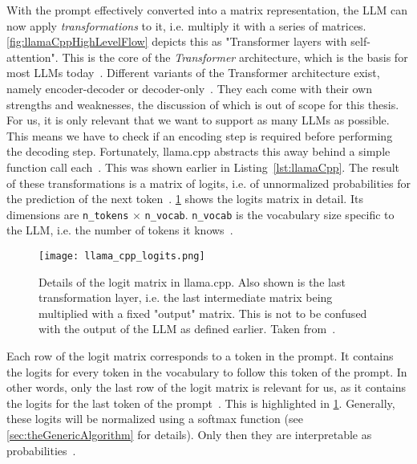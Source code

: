 With the prompt effectively converted into a matrix representation, the \gls{LLM} can now apply \textit{transformations} to it, i.e. multiply it with a series of matrices. \cref{fig:llamaCppHighLevelFlow} depicts this as "Transformer layers with self-attention". This is the core of the \textit{Transformer} architecture, which is the basis for most \glspl{LLM} today~\cite{vaswaniAttentionAllYou2023}. Different variants of the Transformer architecture exist, namely encoder-decoder or decoder-only~\cite{mallisUnderstandingHowLLM2023}. They each come with their own strengths and weaknesses, the discussion of which is out of scope for this thesis. For us, it is only relevant that we want to support as many \glspl{LLM} as possible. This means we have to check if an encoding step is required before performing the decoding step. Fortunately, llama.cpp abstracts this away behind a simple function call each~\cite{gerganovGgerganovLlamacpp2024}. This was shown earlier in Listing~\ref{lst:llamaCpp}. The result of these transformations is a matrix of logits, i.e. of unnormalized probabilities for the prediction of the next token~\cite{mallisUnderstandingHowLLM2023}. \cref{fig:llamaCppLogits} shows the logits matrix in detail. Its dimensions are \lstinline|n_tokens| $\times$ \lstinline|n_vocab|. \lstinline|n_vocab| is the vocabulary size specific to the \gls{LLM}, i.e. the number of tokens it knows~\cite{mallisUnderstandingHowLLM2023}.

\begin{figure}
    \centering
    \captionsetup{width=\linewidth}
    \texttt{[image: llama\_cpp\_logits.png]}
    \caption[llama.cpp: Logit matrix]{Details of the logit matrix in llama.cpp. Also shown is the last transformation layer, i.e. the last intermediate matrix being multiplied with a fixed "output" matrix. This is not to be confused with the output of the \gls{LLM} as defined earlier. Taken from~\cite{mallisUnderstandingHowLLM2023}.}
    \label{fig:llamaCppLogits}
\end{figure}

Each row of the logit matrix corresponds to a token in the prompt. It contains the logits for every token in the vocabulary to follow this token of the prompt. In other words, only the last row of the logit matrix is relevant for us, as it contains the logits for the last token of the prompt~\cite{mallisUnderstandingHowLLM2023}. This is highlighted in \cref{fig:llamaCppLogits}. Generally, these logits will be normalized using a softmax function (see \cref{sec:theGenericAlgorithm} for details). Only then they are interpretable as probabilities~\cite{mallisUnderstandingHowLLM2023,turnerIntroductionTransformers2024}.

